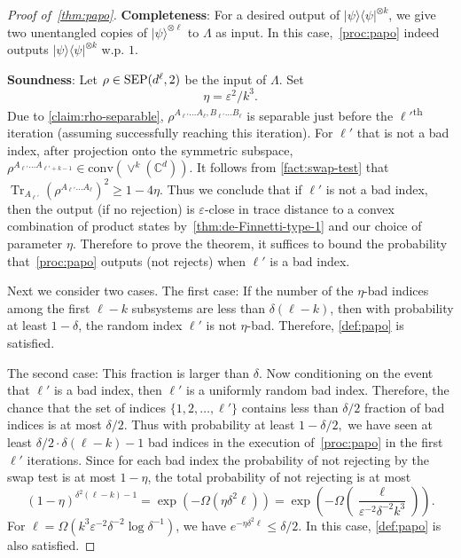 \documentclass[10pt,a4paper]{article}
\theoremstyle{remark}
\def\epsilon{\varepsilon}
\newcommand{\C}{{\mathbb C}}
\newcommand{\conv}[1]{\mathrm{conv}\inparen{#1}}
\newcommand{\poly}{{\mathrm{poly}}}
\newcommand{\1}[1]{\mathds{1}{[#1]}}
\newcommand{\inparen}[1]{\left(#1\right)}             %
\newcommand{\ket}[1]{\lvert #1\rangle}
\newcommand{\SEP}{\textup{SEP}}
\newcommand{\Symm}[2]{\vee^{#1}(\C^{#2})}
\newcommand{\trace}{\operatorname{Tr}}
\newcommand{\bra}[1]{\langle#1|}
\numberwithin{equation}{section}
\begin{document}
\begin{proof}[Proof of~\cref{thm:papo}]
\textbf{Completeness}: For a desired output of $\ket\psi\bra\psi^{\otimes k}$, we give two unentangled copies of $\ket{\psi}^{\otimes \ell}$ to $\Lambda$ as input.
In this case,~\cref{proc:papo} indeed outputs $\ket\psi\bra\psi^{\otimes k}$ w.p. $1$.
  
\textbf{Soundness}: Let $\rho \in \SEP(d^\ell,2)$ be the input of $\Lambda$. 
Set 
\begin{equation*}
\eta= \epsilon^2 / k^3.
\end{equation*}
Due to \cref{claim:rho-separable}, $\rho^{A_{\ell'}\ldots A_\ell,B_{\ell'}\ldots B_\ell}$ is separable just before the $\ell'$\textsuperscript{th} iteration (assuming successfully reaching this iteration). 
For $\ell'$ that is not a bad index,  after projection onto the symmetric subspace, $\rho^{A_{\ell'} \ldots A_{\ell'+k-1}} \in \conv {\Symm{k}{d}} $.  It follows from \cref{fact:swap-test} that
$\trace_{A_{\ell'}}{(\rho^{A_{\ell'}\ldots A_\ell})^2}\ge 1-4\eta.$ Thus we conclude that if $\ell'$ is not a bad index, then the output (if no rejection)
is $\epsilon$-close in trace distance to a convex combination of product states by~\cref{thm:de-Finnetti-type-1} and our choice of parameter $\eta$. Therefore to prove the theorem, it suffices to bound the probability that~\cref{proc:papo} outputs (not rejects) when $\ell'$ is a bad index.

Next we consider two cases. The first case: If the number of the $\eta$-bad indices among the first $\ell-k$ subsystems are less than $\delta (\ell-k)$,
then with probability at least $1-\delta$, the random index $\ell'$ is not $\eta$-bad. 
Therefore, \cref{def:papo} is satisfied.

The second case: This fraction is larger than $\delta$. 
Now conditioning on the event that $\ell'$ is a bad index, then $\ell'$ is a uniformly random bad index. Therefore, the chance that the set of indices $\{1,2,\ldots, \ell'\}$  contains less than  $\delta/2$
fraction of bad indices is at most $\delta/2$. Thus with probability at least $1-\delta/2,$ we have
seen at least $\delta/2 \cdot \delta (\ell-k) -1$ bad indices in the execution of~\cref{proc:papo} in the first $\ell'$ iterations.
Since for each bad index the probability of not rejecting by the swap test is at most $1-\eta$,
the total probability of not rejecting is at most
\begin{equation}\label{eq:papo-delta}
    (1-\eta)^{\delta^2(\ell-k)-1} = \exp(-\Omega(\eta\delta^2\ell))=
        \exp\left(-\Omega\left(\frac{\ell}{\epsilon^{-2}\delta^{-2} k^3}\right)\right). 
\end{equation}
For 
$\ell = \Omega\left(k^3\epsilon^{-2} \delta^{-2}\log\delta^{-1}\right)$, 
we have $e^{-\eta \delta^2 \ell} \le \delta/2$. In this case, \cref{def:papo} is also satisfied.
\end{proof}  
\end{document}
